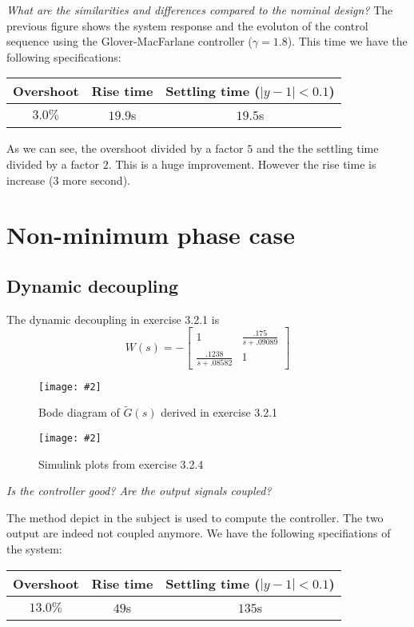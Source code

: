 \documentclass[a4paper,11pt]{article}
\newcommand{\image}[3][width=.8\columnwidth]{
	\begin{figure}[h!]
		\centering
	    \texttt{[image: \#2]}
		\caption{#3}
		\label{fig:#2}
	\end{figure}
}
\begin{document}
    \emph{What are the similarities and differences compared to the nominal design?}
    The previous figure shows the system response and the evoluton of the control sequence using the Glover-MacFarlane controller ($\gamma = 1.8$).
    This time we have the following specifications:
    \begin{center}
    \begin{tabular}{|c|c|c|}
        \hline
        Overshoot & Rise time & Settling time ($|y - 1| < 0.1$)\\
        \hline
        $3.0\%$ & $19.9$s & $19.5$s \\
        \hline
    \end{tabular}
    \end{center}
    As we can see, the overshoot divided by a factor $5$ and the the settling time divided by a factor $2$. This is a huge improvement. However the rise time is increase ($3$ more second).
    

	\section*{Non-minimum phase case}

	\subsection*{Dynamic decoupling}
	The dynamic decoupling in exercise 3.2.1 is
	\[
        W(s) = - \left[\begin{array}{cc} 
                1 & \frac{.175}{s + .09089} \\
    \frac{.1238}{s + .08582} & 1 \end{array} \right]
	\]

	\image{fig/figure_4.eps}{Bode diagram of $\tilde{G}(s)$ derived in exercise 3.2.1}
	\image{fig/figure_5.eps}{Simulink plots from exercise 3.2.4}

    \emph{Is the controller good?	Are the output signals coupled?}

    The method depict in the subject is used to compute the controller. The two output are indeed not coupled anymore. 
    We have the following specifiations of the system:
    \begin{center}
    \begin{tabular}{|c|c|c|}
        \hline
        Overshoot & Rise time & Settling time ($|y - 1| < 0.1$)\\
        \hline
        $13.0\%$ & $49$s & $135$s \\
        \hline
    \end{tabular}
    \end{center}
\end{document}
